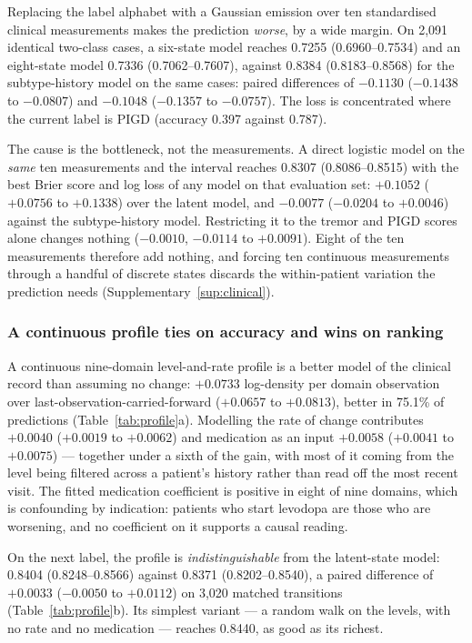 \documentclass[11pt]{article}
\begin{document}
Replacing the label alphabet with a Gaussian emission over ten standardised
clinical measurements makes the prediction \emph{worse}, by a wide margin. On
2,091 identical two-class cases, a six-state model reaches 0.7255
(0.6960--0.7534) and an eight-state model 0.7336 (0.7062--0.7607), against 0.8384
(0.8183--0.8568) for the subtype-history model on the same cases: paired
differences of $-0.1130$ ($-0.1438$ to $-0.0807$) and $-0.1048$ ($-0.1357$ to
$-0.0757$). The loss is concentrated where the current label is PIGD (accuracy
0.397 against 0.787).

The cause is the bottleneck, not the measurements. A direct logistic model on the
\emph{same} ten measurements and the interval reaches 0.8307 (0.8086--0.8515)
with the best Brier score and log loss of any model on that evaluation set:
$+0.1052$ ($+0.0756$ to $+0.1338$) over the latent model, and $-0.0077$
($-0.0204$ to $+0.0046$) against the subtype-history model. Restricting it to the
tremor and PIGD scores alone changes nothing ($-0.0010$, $-0.0114$ to $+0.0091$).
Eight of the ten measurements therefore add nothing, and forcing ten continuous
measurements through a handful of discrete states discards the within-patient
variation the prediction needs (Supplementary~\ref{sup:clinical}).

\subsubsection{A continuous profile ties on accuracy and wins on ranking}

A continuous nine-domain level-and-rate profile is a better model of the clinical
record than assuming no change: $+0.0733$ log-density per domain observation over
last-observation-carried-forward ($+0.0657$ to $+0.0813$), better in 75.1\% of
predictions (Table~\ref{tab:profile}a). Modelling the rate of change contributes
$+0.0040$ ($+0.0019$ to $+0.0062$) and medication as an input $+0.0058$
($+0.0041$ to $+0.0075$) --- together under a sixth of the gain, with most of it
coming from the level being filtered across a patient's history rather than read
off the most recent visit. The fitted medication coefficient is positive in eight
of nine domains, which is confounding by indication: patients who start levodopa
are those who are worsening, and no coefficient on it supports a causal reading.

On the next label, the profile is \emph{indistinguishable} from the latent-state
model: 0.8404 (0.8248--0.8566) against 0.8371 (0.8202--0.8540), a paired
difference of $+0.0033$ ($-0.0050$ to $+0.0112$) on 3,020 matched transitions
(Table~\ref{tab:profile}b). Its simplest variant --- a random walk on the levels,
with no rate and no medication --- reaches 0.8440, as good as its richest.
\end{document}
